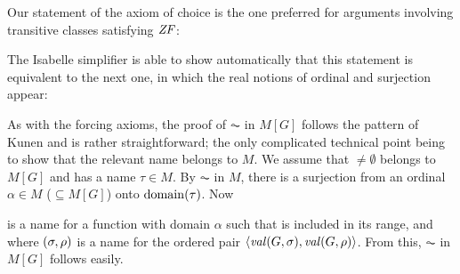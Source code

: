 Our statement of the axiom of choice is the one preferred for
arguments involving transitive classes satisfying $\mathit{ZF}$:
%
\begin{center}
\end{center}
%
The Isabelle simplifier is able to show automatically that this
statement is equivalent to the next one, in which the real notions of
ordinal and surjection appear:
%
\begin{center}
\end{center}

As with the forcing axioms, the proof of $\AC$ in $M[G]$ follows the pattern of Kunen
\cite[IV.2.27]{kunen2011set} and is rather
straightforward; the only complicated technical point being to show
that the relevant name belongs to $M$. We assume that ${}\neq\emptyset$
belongs to $M[G]$ and has a name $\tau\in M$. By $\AC$ in $M$, there
is a surjection  from an ordinal $\alpha\in M$ ($\subseteq M[G]$) onto
$\operatorname{domain}(\tau)$. Now
%
\begin{center}
\end{center}
%
is a name for a function  with domain $\alpha$ such that 
is included in its range, and where
$(\sigma,\rho)$ is a name for the
ordered pair $\langle\operatorname{\mathit{val}}(G,\sigma),\operatorname{\mathit{val}}(G,\rho)\rangle$. From this, $\AC$ in
$M[G]$ follows easily.

